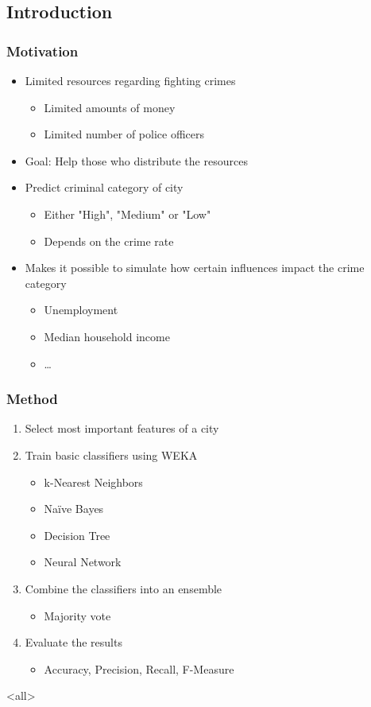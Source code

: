 \mode*

\begin{frame}
  \section{Introduction}
  \frametitle{Motivation}
  \begin{itemize}
    \item Limited resources regarding fighting crimes
      \begin{itemize}
        \item Limited amounts of money
        \item Limited number of police officers
      \end{itemize}
    \item Goal: Help those who distribute the resources
    \item Predict criminal category of city
      \begin{itemize}
        \item Either "High", "Medium" or "Low"
        \item Depends on the crime rate
      \end{itemize}
    \item Makes it possible to simulate how certain influences impact the crime category
      \begin{itemize}
        \item Unemployment
        \item Median household income
        \item \ldots
      \end{itemize}
  \end{itemize}
\end{frame}

\begin{frame}
  \frametitle{Method}
  \begin{enumerate}
    \item Select most important features of a city
    \item Train basic classifiers using WEKA
      \begin{itemize}
        \item k-Nearest Neighbors
        \item Na\"ive Bayes
        \item Decision Tree
        \item Neural Network
      \end{itemize}
    \item Combine the classifiers into an ensemble
      \begin{itemize}
        \item Majority vote
      \end{itemize}
    \item Evaluate the results
      \begin{itemize}
        \item Accuracy, Precision, Recall, F-Measure
      \end{itemize}
  \end{enumerate}
\end{frame}

\mode<all>

